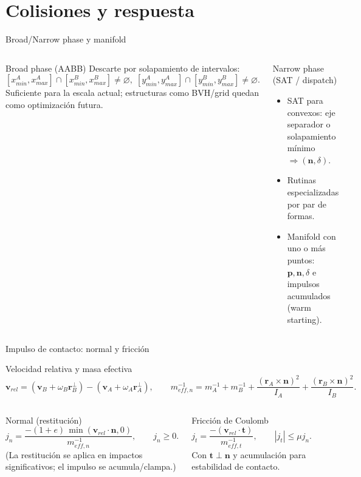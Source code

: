 \documentclass[aspectratio=169,11pt]{beamer}
\begin{document}
\section{Colisiones y respuesta}

\begin{frame}{Broad/Narrow phase y manifold}
  \begin{columns}[T]
    \begin{block}{Broad phase (AABB)}
      Descarte por solapamiento de intervalos:
      \[
        [x_{min}^A,x_{max}^A]\cap[x_{min}^B,x_{max}^B]\neq\varnothing,\;
        [y_{min}^A,y_{max}^A]\cap[y_{min}^B,y_{max}^B]\neq\varnothing.
      \]
      Suficiente para la escala actual; estructuras como BVH/grid quedan como optimización futura.
    \end{block}
    \begin{block}{Narrow phase (SAT / dispatch)}
      \begin{itemize}
        \item SAT para convexos: eje separador o solapamiento mínimo $\Rightarrow (\mathbf{n},\delta)$.
        \item Rutinas especializadas por par de formas.
        \item Manifold con uno o más puntos: $\mathbf{p},\mathbf{n},\delta$ e impulsos acumulados (warm starting).
      \end{itemize}
    \end{block}
  \end{columns}
\end{frame}

\begin{frame}{Impulso de contacto: normal y fricción}
  \begin{block}{Velocidad relativa y masa efectiva}
    \[
      \mathbf{v}_{rel}=(\mathbf{v}_B+\omega_B\mathbf{r}_B^\perp)-(\mathbf{v}_A+\omega_A\mathbf{r}_A^\perp), \qquad
      m_{eff,n}^{-1}=m_A^{-1}+m_B^{-1}+\frac{(\mathbf{r}_A\times\mathbf{n})^2}{I_A}+\frac{(\mathbf{r}_B\times\mathbf{n})^2}{I_B}.
    \]
  \end{block}

  \begin{columns}[T]
    \begin{block}{Normal (restitución)}
      \[
        j_n = \frac{-(1+e)\,\min(\mathbf{v}_{rel}\cdot\mathbf{n},0)}{m_{eff,n}^{-1}}, \qquad j_n \ge 0.
      \]
      (La restitución se aplica en impactos significativos; el impulso se acumula/clampa.)
    \end{block}
    \begin{block}{Fricción de Coulomb}
      \[
        j_t = \frac{-(\mathbf{v}_{rel}\cdot\mathbf{t})}{m_{eff,t}^{-1}}, \qquad |j_t| \le \mu j_n.
      \]
      Con $\mathbf{t}\perp\mathbf{n}$ y acumulación para estabilidad de contacto.
    \end{block}
  \end{columns}
\end{frame}
\end{document}
